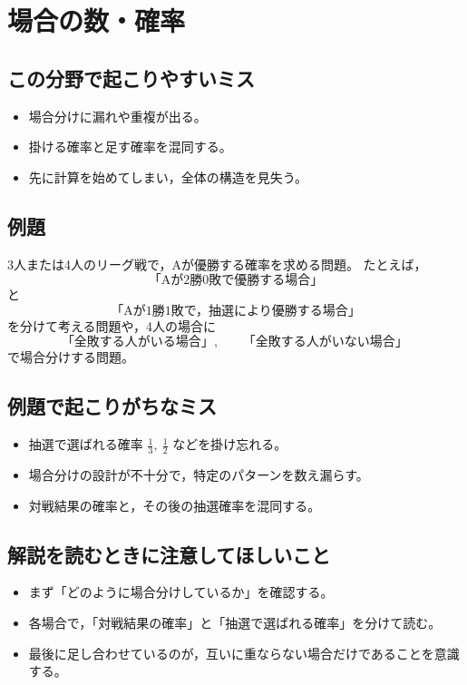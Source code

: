 \bigskip

\section*{場合の数・確率}

\subsection*{この分野で起こりやすいミス}
\begin{itemize}
  \item 場合分けに漏れや重複が出る。
  \item 掛ける確率と足す確率を混同する。
  \item 先に計算を始めてしまい，全体の構造を見失う。
\end{itemize}

\subsection*{例題}
3人または4人のリーグ戦で，Aが優勝する確率を求める問題。  
たとえば，
\[
\text{「Aが2勝0敗で優勝する場合」}
\]
と
\[
\text{「Aが1勝1敗で，抽選により優勝する場合」}
\]
を分けて考える問題や，4人の場合に
\[
\text{「全敗する人がいる場合」},\qquad
\text{「全敗する人がいない場合」}
\]
で場合分けする問題。

\subsection*{例題で起こりがちなミス}
\begin{itemize}
  \item 抽選で選ばれる確率 $\frac13,\ \frac12$ などを掛け忘れる。
  \item 場合分けの設計が不十分で，特定のパターンを数え漏らす。
  \item 対戦結果の確率と，その後の抽選確率を混同する。
\end{itemize}

\subsection*{解説を読むときに注意してほしいこと}
\begin{itemize}
  \item まず「どのように場合分けしているか」を確認する。
  \item 各場合で，「対戦結果の確率」と「抽選で選ばれる確率」を分けて読む。
  \item 最後に足し合わせているのが，互いに重ならない場合だけであることを意識する。
\end{itemize}

